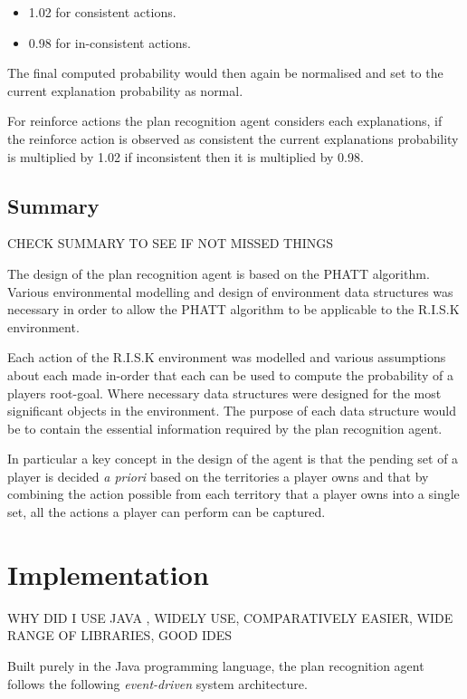 \documentclass[parskip]{cs4rep}
\begin{document}
\begin{itemize}
\item
1.02 for consistent actions.
\item
0.98 for in-consistent actions.
\end{itemize}

The final computed probability would then again be normalised and set to the current explanation probability as normal.

For reinforce actions the plan recognition agent considers each explanations, if the reinforce action is observed as consistent the current explanations probability is multiplied by 1.02 if inconsistent then it is multiplied by 0.98. 

\section{Summary}

CHECK SUMMARY TO SEE IF NOT MISSED THINGS

The design of the plan recognition agent is based on the PHATT algorithm. Various environmental modelling and design of environment data structures was necessary in order to allow the PHATT algorithm to be applicable to the R.I.S.K environment. 

Each action of the R.I.S.K environment was modelled and various assumptions about each made in-order that each can be used to compute the probability of a players root-goal. Where necessary data structures were designed for the most significant objects in the environment. The purpose of each data structure would be to contain the essential information required by the plan recognition agent.

In particular a key concept in the design of the agent is that the pending set of a player is decided \textit{a priori} based on the territories a player owns and that by combining the action possible from each territory that a player owns into a single set, all the actions a player can perform can be captured.

\chapter{Implementation}

WHY DID I USE JAVA , WIDELY USE, COMPARATIVELY EASIER, WIDE RANGE OF LIBRARIES, GOOD IDES

Built purely in the Java programming language, the plan recognition agent follows the following \textit{event-driven} system architecture.
\end{document}
